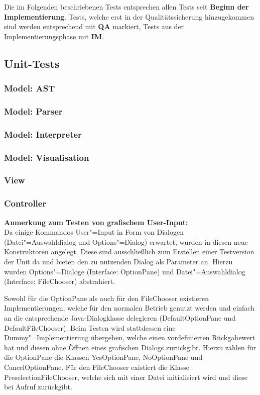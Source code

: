 \documentclass[parskip=full,11pt,twoside]{scrartcl}
\begin{document}
Die im Folgenden beschriebenen Tests entsprechen allen Tests seit \textbf{Beginn der Implementierung}. Tests, welche erst in der Qualitätssicherung hinzugekommen sind werden entsprechend mit \textbf{QA} markiert, Tests aus der Implementierungsphase mit \textbf{IM}.

\subsection{Unit-Tests}

\subsubsection{Model: AST}
\subsubsection{Model: Parser}
\subsubsection{Model: Interpreter}
\subsubsection{Model: Visualisation}
\subsubsection{View}
\subsubsection{Controller}
\textbf{Anmerkung zum Testen von grafischem User-Input:}\\
Da einige Kommandos User"=Input in Form von Dialogen (Datei"=Auswahldialog und Options"=Dialog) erwartet, wurden in diesen neue Konstruktoren angelegt. Diese sind ausschließlich zum Erstellen einer Testversion der Unit da und bieten den zu nutzenden Dialog als Parameter an. Hierzu wurden Options"=Dialoge (Interface: OptionPane) und Datei"=Auswahldialog (Interface: FileChooser) abstrahiert.

Sowohl für die OptionPane als auch für den FileChooser existieren Implementierungen, welche für den normalen Betrieb genutzt werden und einfach an die entsprechende Java-Dialogklasse delegieren (DefaultOptionPane und DefaultFileChooser). Beim Testen wird stattdessen eine Dummy"=Implementierung übergeben, welche einen vordefinierten Rückgabewert hat und diesen ohne Öffnen eines grafischen Dialogs zurückgibt. Hierzu zählen für die OptionPane die Klassen YesOptionPane, NoOptionPane und CancelOptionPane. Für den FileChooser existiert die Klasse PreselectionFileChooser, welche sich mit einer Datei initialisiert wird und diese bei Aufruf zurückgibt.
\end{document}
